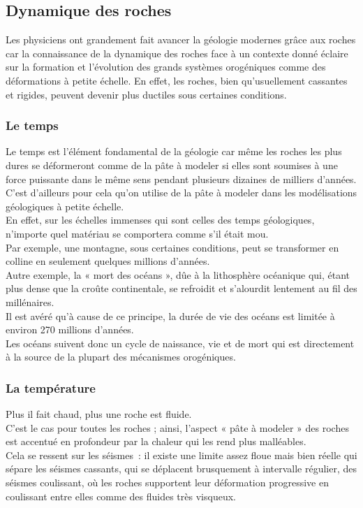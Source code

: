 \documentclass[a4paper,11pt]{article}
\begin{document}
\subsection{Dynamique des roches}
	
Les physiciens ont grandement fait avancer la géologie modernes grâce aux roches car la connaissance de la dynamique des roches face à un contexte donné éclaire sur la formation et l'évolution des grands systèmes orogéniques comme des déformations à petite échelle.
En effet, les roches, bien qu'usuellement cassantes et rigides, peuvent devenir plus ductiles sous certaines conditions. \\

\subsubsection{Le temps}

Le temps est l'élément fondamental de la géologie car même les roches les plus dures se déformeront comme de la pâte à modeler si elles sont soumises à une force puissante dans le même sens pendant plusieurs dizaines de milliers d'années. C'est d'ailleurs pour cela qu'on utilise de la pâte à modeler dans les modélisations géologiques à petite échelle.\\
En effet, sur les échelles immenses qui sont celles des temps géologiques, n'importe quel matériau se comportera comme s'il était mou.\\
Par exemple, une montagne, sous certaines conditions, peut se transformer en colline en seulement quelques millions d'années.\\
Autre exemple, la « mort des océans », dûe à la lithosphère océanique qui, étant plus dense que la croûte continentale, se refroidit et s'alourdit lentement au fil des millénaires.\\
Il est avéré qu'à cause de ce principe, la durée de vie des océans est limitée à environ 270 millions d'années.\\
Les océans suivent donc un cycle de naissance, vie et de mort qui est directement à la source de la plupart des mécanismes orogéniques.

\subsubsection{La température}

Plus il fait chaud, plus une roche est fluide.\\
C'est le cas pour toutes les roches ; ainsi, l'aspect « pâte à modeler » des roches est accentué en profondeur par la chaleur qui les rend plus malléables.\\
Cela se ressent sur les séismes~: il existe une limite assez floue mais bien réelle qui sépare les séismes cassants, qui se déplacent brusquement à intervalle régulier, des séismes coulissant, où les roches supportent leur déformation progressive en coulissant entre elles comme des fluides très visqueux.
\end{document}
